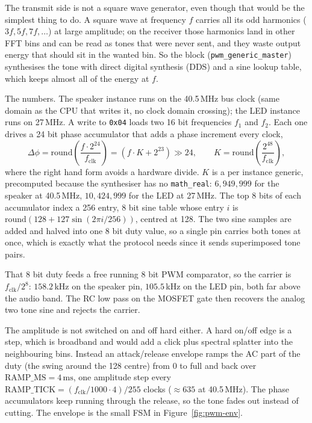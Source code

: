 \documentclass[a4paper,11pt]{article}
\begin{document}
The transmit side is not a square wave generator, even though that would be the
simplest thing to do. A square wave at frequency $f$ carries all its odd harmonics
($3f, 5f, 7f, \dots$) at large amplitude; on the receiver those harmonics land in
other FFT bins and can be read as tones that were never sent, and they waste output
energy that should sit in the wanted bin. So the block (\texttt{pwm\_generic\_master})
synthesises the tone with direct digital synthesis (DDS) and a sine lookup table,
which keeps almost all of the energy at $f$.

The numbers. The speaker instance runs on the 40.5\,MHz bus clock (same domain as
the CPU that writes it, no clock domain crossing); the LED instance runs on
27\,MHz. A write to \texttt{0x04} loads two 16 bit
frequencies $f_1$ and $f_2$. Each one drives a 24 bit phase accumulator that adds a
phase increment every clock,
\[
  \Delta\phi = \mathrm{round}\!\left(\frac{f \cdot 2^{24}}{f_\mathrm{clk}}\right)
             = (f \cdot K + 2^{23}) \gg 24, \qquad
  K = \mathrm{round}\!\left(\frac{2^{48}}{f_\mathrm{clk}}\right),
\]
where the right hand form avoids a hardware divide. $K$ is a per instance generic,
precomputed because the synthesiser has no \texttt{math\_real}: $6{,}949{,}999$ for
the speaker at 40.5\,MHz, $10{,}424{,}999$ for the LED at 27\,MHz. The top 8 bits of
each accumulator index a 256 entry, 8 bit sine table whose entry
$i$ is $\mathrm{round}(128 + 127 \sin(2\pi i / 256))$, centred at 128. The two sine
samples are added and halved into one 8 bit duty value, so a single pin carries both
tones at once, which is exactly what the protocol needs since it sends superimposed
tone pairs.

That 8 bit duty feeds a free running 8 bit PWM comparator, so the carrier is
$f_\mathrm{clk} / 2^8$: $158.2$\,kHz on the speaker pin, $105.5$\,kHz on the LED
pin, both far above the audio band. The RC low
pass on the MOSFET gate then recovers the analog two tone sine and rejects the
carrier.

The amplitude is not switched on and off hard either. A hard on/off edge is a step,
which is broadband and would add a click plus spectral splatter into the neighbouring
bins. Instead an attack/release envelope ramps the AC part of the duty (the swing
around the 128 centre) from 0 to full and back over $\mathrm{RAMP\_MS} = 4\,\mathrm{ms}$,
one amplitude step every $\mathrm{RAMP\_TICK} = (f_\mathrm{clk}/1000 \cdot 4)/255$
clocks ($\approx 635$ at 40.5\,MHz). The phase accumulators keep running through the
release, so the tone fades out instead of cutting. The envelope is the small FSM in
Figure~\ref{fig:pwm-env}.
\end{document}
